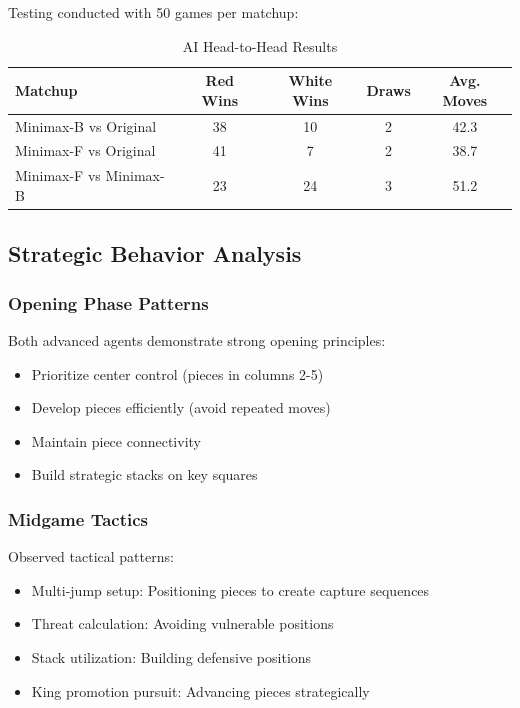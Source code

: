 \documentclass[12pt,a4paper]{article}
\begin{document}
Testing conducted with 50 games per matchup:

\begin{table}[H]
\centering
\caption{AI Head-to-Head Results}
\begin{tabular}{@{}lcccc@{}}
\toprule
\textbf{Matchup} & \textbf{Red Wins} & \textbf{White Wins} & \textbf{Draws} & \textbf{Avg. Moves} \\
\midrule
Minimax-B vs Original & 38 & 10 & 2 & 42.3 \\
Minimax-F vs Original & 41 & 7 & 2 & 38.7 \\
Minimax-F vs Minimax-B & 23 & 24 & 3 & 51.2 \\
\bottomrule
\end{tabular}
\end{table}

\subsection{Strategic Behavior Analysis}

\subsubsection{Opening Phase Patterns}

Both advanced agents demonstrate strong opening principles:
\begin{itemize}
    \item Prioritize center control (pieces in columns 2-5)
    \item Develop pieces efficiently (avoid repeated moves)
    \item Maintain piece connectivity
    \item Build strategic stacks on key squares
\end{itemize}

\subsubsection{Midgame Tactics}

Observed tactical patterns:
\begin{itemize}
    \item Multi-jump setup: Positioning pieces to create capture sequences
    \item Threat calculation: Avoiding vulnerable positions
    \item Stack utilization: Building defensive positions
    \item King promotion pursuit: Advancing pieces strategically
\end{itemize}
\end{document}
